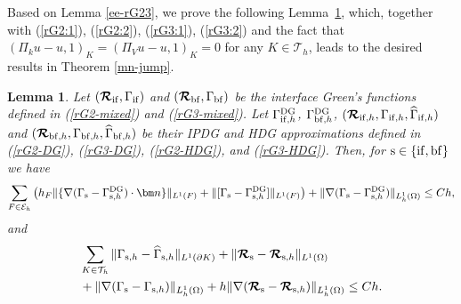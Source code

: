 \documentclass[1996/10/24]{amsart}
\newtheorem{lemma}[theorem]{Lemma}
\theoremstyle{definition}
\numberwithin{equation}{section}
\begin{document}
Based on Lemma \ref{ee-rG23}, we prove the following Lemma~\ref{rG23-L1}, which, together with (\ref{rG2:1}), (\ref{rG2:2}), (\ref{rG3:1}), (\ref{rG3:2}) and the fact that $(\Pi_{k}u-u,1)_{K}=(\Pi_{V}u-u,1)_{K}=0$ for any $K \in \mathcal{T}_{h}$, leads to the desired results in Theorem \ref{mn-jump}.
\begin{lemma}\label{rG23-L1}
Let $(\boldsymbol{\mathcal{R}}_{{\rm if}},\Gamma_{{\rm if}})$ and $(\boldsymbol{\mathcal{R}}_{{\rm bf}},\Gamma_{{\rm bf}})$ be the interface Green's functions defined in (\ref{rG2-mixed}) and (\ref{rG3-mixed}). Let $\Gamma_{{\rm if},h}^{{\rm DG}}$, $\Gamma_{{\rm bf},h}^{{\rm DG}}$, $(\boldsymbol{\mathcal{R}}_{{\rm if},h},\Gamma_{{\rm if},h},\widehat{\Gamma}_{{\rm if},h})$ and $(\boldsymbol{\mathcal{R}}_{{\rm bf},h},\Gamma_{{\rm bf},h},\widehat{\Gamma}_{{\rm bf},h})$ be their IPDG and HDG approximations defined in (\ref{rG2-DG}), (\ref{rG3-DG}), (\ref{rG2-HDG}), and (\ref{rG3-HDG}).
Then, for ${\rm s\in\{if, bf\}}$ we have
\begin{align}
\sum_{F\in\mathcal{E}_h}\left(h_F\|\{\nabla(\Gamma_{{\rm s}}-\Gamma_{{\rm s},h}^{{\rm DG}})\cdot{\bm n}\}\|_{L^1(F)}+\|[\Gamma_{{\rm s}}-\Gamma_{{\rm s},h}^{{\rm DG}}]\|_{L^1(F)}\right)+\|\nabla(\Gamma_{{\rm s}}-\Gamma_{{\rm s},h}^{{\rm DG}})\|_{L_h^1(\Omega)}\leq Ch,\label{rG23-L1-DG}
\end{align}
and
\begin{align}
&\sum_{K\in\mathcal{T}_h}\|\Gamma_{{\rm s},h}-\widehat{\Gamma}_{{\rm s},h}\|_{L^1(\partial K)}
+\|\boldsymbol{\mathcal{R}}_{{\rm s}}-\boldsymbol{\mathcal{R}}_{{\rm s},h}\|_{L^1(\Omega)}\nonumber\\
&+\|\nabla(\Gamma_{{\rm s}}-\Gamma_{{\rm s},h})\|_{L_h^1(\Omega)}+h\|\nabla(\boldsymbol{\mathcal{R}}_{{\rm s}}-\boldsymbol{\mathcal{R}}_{{\rm s},h})\|_{L_h^1(\Omega)}\leq Ch.\label{rG23-L1-HDG}
\end{align}
\end{lemma}
\end{document}
